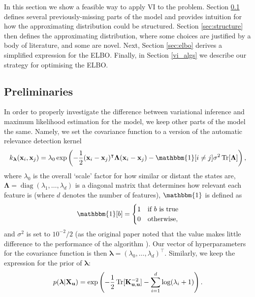 \documentclass{mprop}
\theoremstyle{definition}
\DeclareMathOperator{\Tr}{Tr}
\DeclareMathOperator{\diag}{diag}
\begin{document}
In this section we show a feasible way to apply VI to the problem. Section
\ref{sec:preliminaries} defines several previously-missing parts of the model
and provides intuition for how the approximating distribution could be
structured. Section \ref{sec:structure} then defines the approximating
distribution, where some choices are justified by a body of literature, and some
are novel. Next, Section \ref{sec:elbo} derives a simplified expression for the
ELBO. Finally, in Section \ref{vi_algs} we describe our strategy for
optimising the ELBO.

\subsection{Preliminaries} \label{sec:preliminaries}

In order to properly investigate the difference between variational inference
and maximum likelihood estimation for the model, we keep other parts of the
model the same. Namely, we set the covariance function to a version of the
automatic relevance detection kernel
\cite{DBLP:conf/nips/LevinePK11,neal2012bayesian}
\[ k_{\bm\lambda}(\mathbf{x}_i, \mathbf{x}_j) = \lambda_0\exp\left(
    -\frac{1}{2}(\mathbf{x}_i - \mathbf{x}_j)^\intercal\bm\Lambda(\mathbf{x}_i -
    \mathbf{x}_j) - \mathbbm{1}[i \ne j]\sigma^2\Tr[\bm\Lambda] \right), \]
where $\lambda_0$ is the overall `scale' factor for how similar or distant the
states are, $\bm\Lambda = \diag(\lambda_1, \dots, \lambda_d)$ is a diagonal
matrix that determines how relevant each feature is (where $d$ denotes the
number of features), $\mathbbm{1}$ is defined as
\[ \mathbbm{1}[b] = \begin{cases}
    1 & \mbox{if $b$ is true} \\
    0 & \mbox{otherwise},
  \end{cases} \]
and $\sigma^2$ is set to $10^{-2}/2$ (as the original paper noted that
the value makes little difference to the performance of the algorithm
\cite{DBLP:conf/nips/LevinePK11}). Our vector of hyperparameters for the
covariance function is then $\bm\lambda = (\lambda_0, \dots,
\lambda_d)^\intercal$. Similarly, we keep the expression for the prior of
$\bm\lambda$:
\begin{equation} \label{eq:theta_prior}
  p(\bm\lambda | \mathbf{X_u}) = \exp\left( -\frac{1}{2}\Tr[\Kuu^{-2}] -
    \sum_{i=1}^d \log(\lambda_i + 1) \right).
\end{equation}
\end{document}
